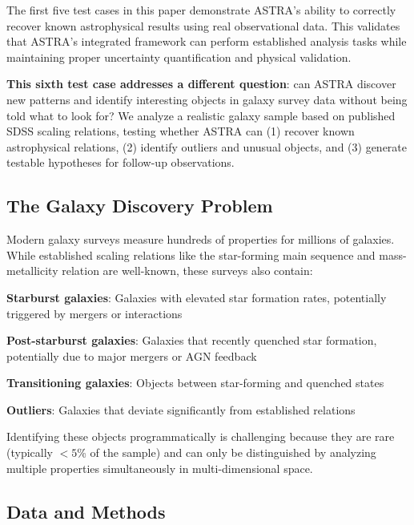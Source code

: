 \documentclass[usenatbib]{rasti}
\begin{document}
The first five test cases in this paper demonstrate ASTRA's ability to correctly recover known astrophysical results using real observational data. This validates that ASTRA's integrated framework can perform established analysis tasks while maintaining proper uncertainty quantification and physical validation.

\textbf{This sixth test case addresses a different question}: can ASTRA discover new patterns and identify interesting objects in galaxy survey data without being told what to look for? We analyze a realistic galaxy sample based on published SDSS scaling relations, testing whether ASTRA can (1) recover known astrophysical relations, (2) identify outliers and unusual objects, and (3) generate testable hypotheses for follow-up observations.

\subsection{The Galaxy Discovery Problem}

Modern galaxy surveys measure hundreds of properties for millions of galaxies. While established scaling relations like the star-forming main sequence and mass-metallicity relation are well-known, these surveys also contain:
\begin{description}
\item \textbf{Starburst galaxies}: Galaxies with elevated star formation rates, potentially triggered by mergers or interactions
\item \textbf{Post-starburst galaxies}: Galaxies that recently quenched star formation, potentially due to major mergers or AGN feedback
\item \textbf{Transitioning galaxies}: Objects between star-forming and quenched states
\item \textbf{Outliers}: Galaxies that deviate significantly from established relations
\end{description}

Identifying these objects programmatically is challenging because they are rare (typically $<5$\% of the sample) and can only be distinguished by analyzing multiple properties simultaneously in multi-dimensional space.

\subsection{Data and Methods}
\end{document}
